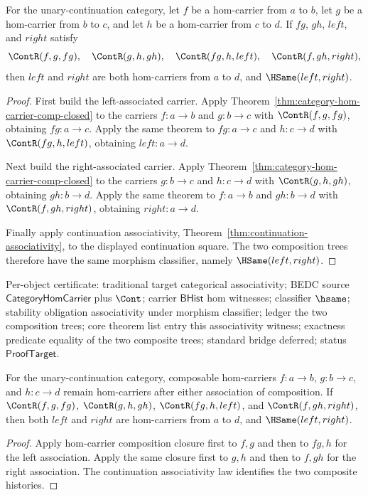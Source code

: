 \begin{theorem}
\label{thm:category-hom-carrier-assoc-witness}
For the unary-continuation category, let $f$ be a hom-carrier from $a$ to $b$, let $g$ be a hom-carrier from $b$ to $c$, and let $h$ be a hom-carrier from $c$ to $d$. If $fg$, $gh$, $left$, and $right$ satisfy
$$
\ContR(f,g,fg),\quad \ContR(g,h,gh),\quad \ContR(fg,h,left),\quad \ContR(f,gh,right),
$$
then $left$ and $right$ are both hom-carriers from $a$ to $d$, and $\HSame(left,right)$.
\end{theorem}
\begin{proof}
First build the left-associated carrier. Apply Theorem~\ref{thm:category-hom-carrier-comp-closed} to the carriers $f:a\to b$ and $g:b\to c$ with $\ContR(f,g,fg)$, obtaining $fg:a\to c$. Apply the same theorem to $fg:a\to c$ and $h:c\to d$ with $\ContR(fg,h,left)$, obtaining $left:a\to d$.

Next build the right-associated carrier. Apply Theorem~\ref{thm:category-hom-carrier-comp-closed} to the carriers $g:b\to c$ and $h:c\to d$ with $\ContR(g,h,gh)$, obtaining $gh:b\to d$. Apply the same theorem to $f:a\to b$ and $gh:b\to d$ with $\ContR(f,gh,right)$, obtaining $right:a\to d$.

Finally apply continuation associativity, Theorem~\ref{thm:continuation-associativity}, to the displayed continuation square. The two composition trees therefore have the same morphism classifier, namely $\HSame(left,right)$.
\end{proof}

Per-object certificate: traditional target categorical associativity; BEDC source $\mathsf{CategoryHomCarrier}$ plus $\Cont$; carrier $\mathsf{BHist}$ hom witnesses; classifier $\hsame$; stability obligation associativity under morphism classifier; ledger the two composition trees; core theorem list entry this associativity witness; exactness predicate equality of the two composite trees; standard bridge deferred; status $\mathsf{ProofTarget}$.



\begin{theorem}
\label{thm:category-hom-carrier-comp-assoc-closed}
For the unary-continuation category, composable hom-carriers \(f:a\to b\),
\(g:b\to c\), and \(h:c\to d\) remain hom-carriers after either
association of composition. If \(\ContR(f,g,fg)\), \(\ContR(g,h,gh)\),
\(\ContR(fg,h,left)\), and \(\ContR(f,gh,right)\), then both \(left\) and
\(right\) are hom-carriers from \(a\) to \(d\), and
\(\HSame(left,right)\).
\end{theorem}
\begin{proof}
Apply hom-carrier composition closure first to \(f,g\) and then to \(fg,h\)
for the left association. Apply the same closure first to \(g,h\) and then
to \(f,gh\) for the right association. The continuation associativity law
identifies the two composite histories.
\end{proof}

